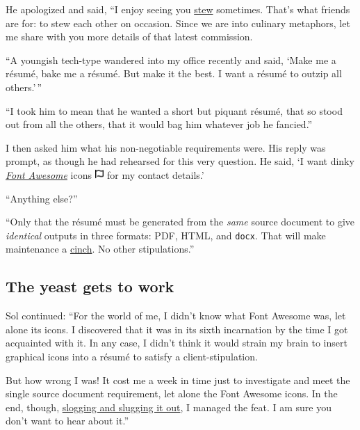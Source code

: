 \documentclass[
  british,
  a4paper,
  rgb,
  dvipsnames,
  svgnames,
  hyphens]{article}
\begin{document}
He apologized and said, ``I enjoy seeing you
\href{https://www.thefreedictionary.com/stew}{stew} sometimes. That's
what friends are for: to stew each other on occasion. Since we are into
culinary metaphors, let me share with you more details of that latest
commission.

``A youngish tech-type wandered into my office recently and said, `Make
me a résumé, bake me a résumé. But make it the best. I want a résumé to
outzip all others.'\,''

``I took him to mean that he wanted a short but piquant résumé, that so
stood out from all the others, that it would bag him whatever job he
fancied.''

I then asked him what his non-negotiable requirements were. His reply
was prompt, as though he had rehearsed for this very question. He said,
`I want dinky \href{https://fontawesome.com/}{\emph{Font Awesome}} icons
\includegraphics[width=0.025\textwidth,height=\textheight]{images/font-awesome.svg}
for my contact details.'

``Anything else?''

``Only that the résumé must be generated from the \emph{same} source
document to give \emph{identical} outputs in three formats: PDF, HTML,
and \texttt{docx}. That will make maintenance a
\href{https://www.merriam-webster.com/dictionary/cinch}{cinch}. No other
stipulations.''

\hypertarget{the-yeast-gets-to-work}{%
\subsection{The yeast gets to work}\label{the-yeast-gets-to-work}}

Sol continued: ``For the world of me, I didn't know what Font Awesome
was, let alone its icons. I discovered that it was in its sixth
incarnation by the time I got acquainted with it. In any case, I didn't
think it would strain my brain to insert graphical icons into a résumé
to satisfy a client-stipulation.

But how wrong I was! It cost me a week in time just to investigate and
meet the single source document requirement, let alone the Font Awesome
icons. In the end, though,
\href{https://idioms.thefreedictionary.com/slog\%2Fslug+it+outslogging}{slogging
and slugging it out}, I managed the feat. I am sure you don't want to
hear about it.''
\end{document}
